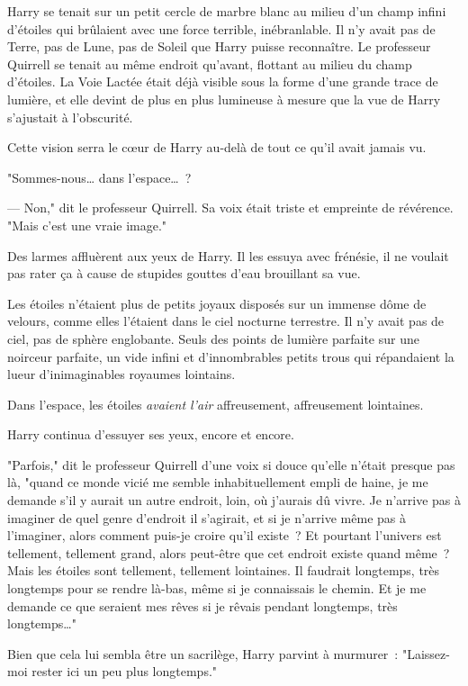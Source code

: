 Harry se tenait sur un petit cercle de marbre blanc au milieu d'un champ infini d'étoiles qui brûlaient avec une force terrible, inébranlable. Il n'y avait pas de Terre, pas de Lune, pas de Soleil que Harry puisse reconnaître. Le professeur Quirrell se tenait au même endroit qu'avant, flottant au milieu du champ d'étoiles. La Voie Lactée était déjà visible sous la forme d'une grande trace de lumière, et elle devint de plus en plus lumineuse à mesure que la vue de Harry s'ajustait à l'obscurité.

Cette vision serra le cœur de Harry au-delà de tout ce qu'il avait jamais vu.

"Sommes-nous… dans l'espace…~?

--- Non," dit le professeur Quirrell. Sa voix était triste et empreinte de révérence. "Mais c'est une vraie image."

Des larmes affluèrent aux yeux de Harry. Il les essuya avec frénésie, il ne voulait pas rater ça à cause de stupides gouttes d'eau brouillant sa vue.

Les étoiles n'étaient plus de petits joyaux disposés sur un immense dôme de velours, comme elles l'étaient dans le ciel nocturne terrestre. Il n'y avait pas de ciel, pas de sphère englobante. Seuls des points de lumière parfaite sur une noirceur parfaite, un vide infini et d'innombrables petits trous qui répandaient la lueur d'inimaginables royaumes lointains.

Dans l'espace, les étoiles \emph{avaient l'air} affreusement, affreusement lointaines.

Harry continua d'essuyer ses yeux, encore et encore.

"Parfois," dit le professeur Quirrell d'une voix si douce qu'elle n'était presque pas là, "quand ce monde vicié me semble inhabituellement empli de haine, je me demande s'il y aurait un autre endroit, loin, où j'aurais dû vivre. Je n'arrive pas à imaginer de quel genre d'endroit il s'agirait, et si je n'arrive même pas à l'imaginer, alors comment puis-je croire qu'il existe~? Et pourtant l'univers est tellement, tellement grand, alors peut-être que cet endroit existe quand même~? Mais les étoiles sont tellement, tellement lointaines. Il faudrait longtemps, très longtemps pour se rendre là-bas, même si je connaissais le chemin. Et je me demande ce que seraient mes rêves si je rêvais pendant longtemps, très longtemps…"

Bien que cela lui sembla être un sacrilège, Harry parvint à murmurer~: "Laissez-moi rester ici un peu plus longtemps."

